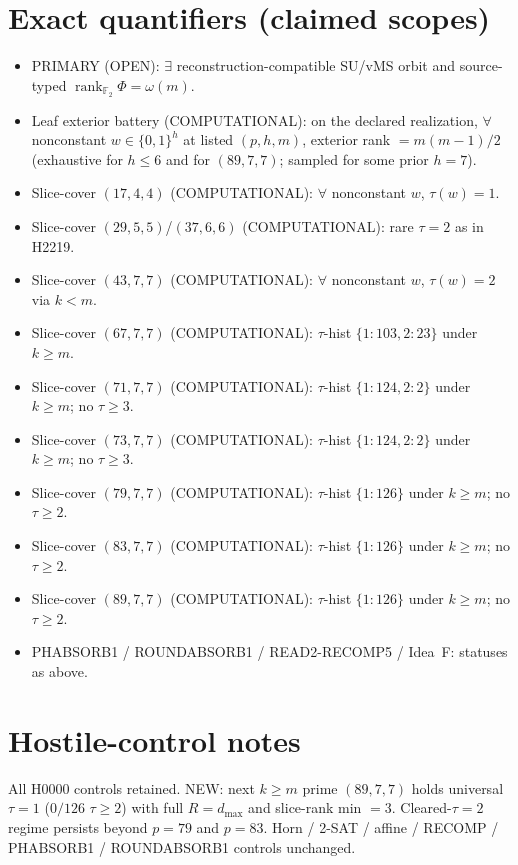 \documentclass[11pt]{article}
\begin{document}
\section*{Exact quantifiers (claimed scopes)}
\begin{itemize}
\item PRIMARY (OPEN): $\exists$ reconstruction-compatible SU/vMS orbit and source-typed
  $\operatorname{rank}_{\mathbb F_2}\Phi=\omega(m)$.
\item Leaf exterior battery (COMPUTATIONAL): on the declared realization, $\forall$ nonconstant
  $w\in\{0,1\}^h$ at listed $(p,h,m)$, exterior rank $=m(m-1)/2$
  (exhaustive for $h\le6$ and for $(89,7,7)$; sampled for some prior $h{=}7$).
\item Slice-cover $(17,4,4)$ (COMPUTATIONAL): $\forall$ nonconstant $w$, $\tau(w)=1$.
\item Slice-cover $(29,5,5)$/$(37,6,6)$ (COMPUTATIONAL): rare $\tau{=}2$ as in H2219.
\item Slice-cover $(43,7,7)$ (COMPUTATIONAL): $\forall$ nonconstant $w$, $\tau(w)=2$ via $k{<}m$.
\item Slice-cover $(67,7,7)$ (COMPUTATIONAL): $\tau$-hist $\{1{:}103,2{:}23\}$ under $k{\ge}m$.
\item Slice-cover $(71,7,7)$ (COMPUTATIONAL): $\tau$-hist $\{1{:}124,2{:}2\}$ under $k{\ge}m$;
  no $\tau{\ge}3$.
\item Slice-cover $(73,7,7)$ (COMPUTATIONAL): $\tau$-hist $\{1{:}124,2{:}2\}$ under $k{\ge}m$;
  no $\tau{\ge}3$.
\item Slice-cover $(79,7,7)$ (COMPUTATIONAL): $\tau$-hist $\{1{:}126\}$ under $k{\ge}m$;
  no $\tau{\ge}2$.
\item Slice-cover $(83,7,7)$ (COMPUTATIONAL): $\tau$-hist $\{1{:}126\}$ under $k{\ge}m$;
  no $\tau{\ge}2$.
\item Slice-cover $(89,7,7)$ (COMPUTATIONAL): $\tau$-hist $\{1{:}126\}$ under $k{\ge}m$;
  no $\tau{\ge}2$.
\item PHABSORB1 / ROUNDABSORB1 / READ2-RECOMP5 / Idea~F: statuses as above.
\end{itemize}

\section*{Hostile-control notes}
All H0000 controls retained. NEW: next $k{\ge}m$ prime $(89,7,7)$ holds universal
$\tau{=}1$ ($0/126$ $\tau{\ge}2$) with full $R{=}d_{\max}$ and slice-rank min $=3$.
Cleared-$\tau{=}2$ regime persists beyond $p{=}79$ and $p{=}83$. Horn / 2-SAT / affine /
RECOMP / PHABSORB1 / ROUNDABSORB1 controls unchanged.
\end{document}
